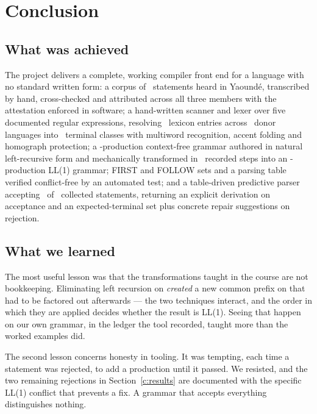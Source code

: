 \section{Conclusion}\label{c:conclusion}

\subsection{What was achieved}

The project delivers a complete, working compiler front end for a language with no standard
written form: a corpus of \CorpusTotal\ statements heard in Yaound\'e, transcribed by hand,
cross-checked and attributed across all three members with the attestation enforced in
software; a hand-written scanner and lexer over five documented regular expressions,
resolving \LexiconTotal\ lexicon entries across \OriginCount\ donor languages into
\TerminalCount\ terminal classes with multiword recognition, accent folding and homograph
protection; a \ProductionCount-production context-free grammar authored in natural
left-recursive form and mechanically transformed in \LedgerSteps\ recorded steps into an
\ExecProductionCount-production LL(1) grammar; FIRST and FOLLOW sets and a parsing table
verified conflict-free by an automated test; and a table-driven predictive parser accepting
\CorpusAccepted\ of \CorpusTotal\ collected statements, returning an explicit derivation on
acceptance and an expected-terminal set plus concrete repair suggestions on rejection.

\subsection{What we learned}

The most useful lesson was that the transformations taught in the course are not
bookkeeping. Eliminating left recursion on  \emph{created} a new common prefix
on  that had to be factored out afterwards --- the two techniques interact, and the
order in which they are applied decides whether the result is LL(1). Seeing that happen on
our own grammar, in the ledger the tool recorded, taught more than the worked examples did.

The second lesson concerns honesty in tooling. It was tempting, each time a statement was
rejected, to add a production until it passed. We resisted, and the two remaining rejections
in Section~\ref{c:results} are documented with the specific LL(1) conflict that prevents a
fix. A grammar that accepts everything distinguishes nothing.

